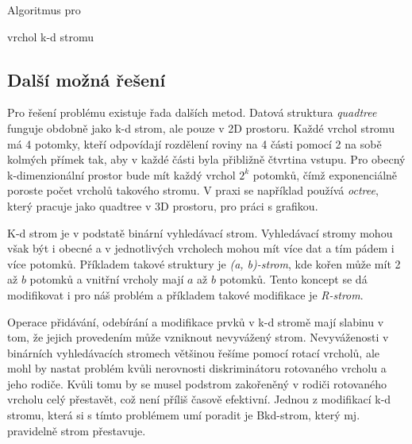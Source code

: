 \begin{algorithm}
  \label{algo:kd-tree-range-search}
  \caption{Algoritmus pro }
  \begin{algorithmic}
    \REQUIRE vrchol k-d stromu
  \end{algorithmic}
\end{algorithm}

\subsection{Další možná řešení}

Pro řešení problému existuje řada dalších metod. Datová struktura \textit{quadtree} funguje obdobně jako k-d strom, ale pouze v 2D prostoru. Každé vrchol stromu má 4 potomky, kteří odpovídají rozdělení roviny na 4 části pomocí 2 na sobě kolmých přímek tak, aby v každé části byla přibližně čtvrtina vstupu. Pro obecný k-dimenzionální prostor bude mít každý vrchol $2^k$ potomků, čímž exponenciálně poroste počet vrcholů takového stromu. V praxi se například používá \textit{octree}, který pracuje jako quadtree v 3D prostoru, pro práci s grafikou.\cite{octree-usage}

K-d strom je v podstatě binární vyhledávací strom. Vyhledávací stromy mohou však být i obecné a v jednotlivých vrcholech mohou mít více dat a tím pádem i více potomků. Příkladem takové struktury je \textit{(a, b)-strom}, kde kořen může mít 2 až $b$ potomků a vnitřní vrcholy mají $a$ až $b$ potomků.\cite[s.~190--198]{pruvodce} Tento koncept se dá modifikovat i pro náš problém a příkladem takové modifikace je \textit{R-strom}.\cite{r-tree}

Operace přidávání, odebírání a modifikace prvků v k-d stromě mají slabinu v tom, že jejich provedením může vzniknout nevyvážený strom. Nevyváženosti v binárních vyhledávacích stromech většinou řešíme pomocí rotací vrcholů, ale mohl by nastat problém kvůli nerovnosti diskriminátoru rotovaného vrcholu a jeho rodiče. Kvůli tomu by se musel podstrom zakořeněný v rodiči rotovaného vrcholu celý přestavět, což není příliš časově efektivní. Jednou z modifikací k-d stromu, která si s tímto problémem umí poradit je Bkd-strom, který mj. pravidelně strom přestavuje.\cite{bkd-tree}
